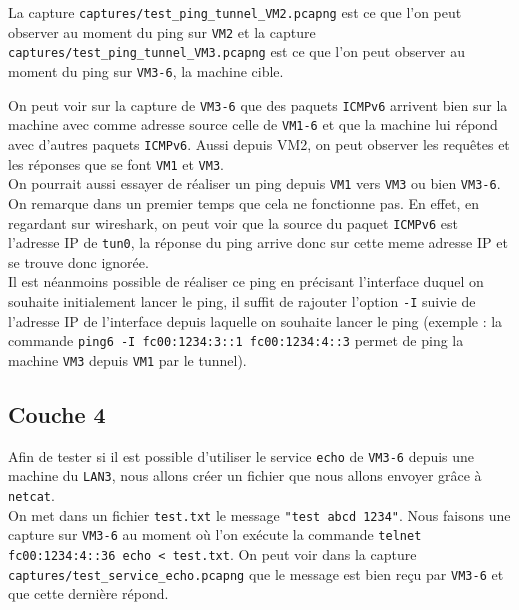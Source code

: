 \documentclass[a4paper, 10pt]{article}
\begin{document}
      La capture \verb+captures/test_ping_tunnel_VM2.pcapng+ est ce que l'on
      peut observer au moment du ping sur \verb+VM2+ et la capture
      \verb+captures/test_ping_tunnel_VM3.pcapng+ est ce que l'on peut observer
      au moment du ping sur \verb+VM3-6+, la machine cible.

      On peut voir sur la capture de \verb+VM3-6+ que des paquets \verb+ICMPv6+
      arrivent bien sur la machine avec comme adresse source celle de
      \verb+VM1-6+ et que la machine lui répond avec d'autres paquets
      \verb+ICMPv6+. Aussi depuis VM2, on peut observer les requêtes et les
      réponses que se font \verb+VM1+ et \verb+VM3+. \\

      On pourrait aussi essayer de réaliser un ping depuis \verb+VM1+ vers
      \verb+VM3+ ou bien \verb+VM3-6+. On remarque dans un premier temps que
      cela ne fonctionne pas. En effet, en regardant sur wireshark, on peut voir
      que la source du paquet \verb+ICMPv6+ est l'adresse IP de \verb+tun0+, la
      réponse du ping arrive donc sur cette meme adresse IP et se trouve donc
      ignorée. \\

      Il est néanmoins possible de réaliser ce ping en précisant l'interface
      duquel on souhaite initialement lancer le ping, il suffit de rajouter
      l'option \verb+-I+ suivie de l'adresse IP de l'interface depuis laquelle
      on souhaite lancer le ping (exemple : la commande
      \verb+ping6 -I fc00:1234:3::1 fc00:1234:4::3+ permet de ping la machine
      \verb+VM3+ depuis \verb+VM1+ par le tunnel).

    \subsection{Couche 4}
      Afin de tester si il est possible d'utiliser le service \verb+echo+ de
      \verb+VM3-6+ depuis une machine du \verb+LAN3+, nous allons créer un
      fichier que nous allons envoyer grâce à \verb+netcat+. \\

      On met dans un fichier \verb+test.txt+ le message \verb+"test abcd 1234"+.
      Nous faisons une capture sur \verb+VM3-6+ au moment où l'on exécute la
      commande \verb+telnet fc00:1234:4::36 echo < test.txt+. On peut voir dans
      la capture \verb+captures/test_service_echo.pcapng+ que le message est
      bien reçu par \verb+VM3-6+ et que cette dernière répond.
\end{document}
